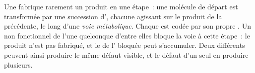 \begin{proposition}\label{prop:g11:enzymes-and-phenotype:pathway}
Une  fabrique rarement un produit en une étape~: une molécule de
départ est transformée par une succession d', chacune agissant
sur le produit de la précédente, le long d'une
\emph{voie métabolique}. Chaque  est
codée par son propre . Un  non fonctionnel de l'une
quelconque d'entre elles bloque la voie à cette étape~: le produit
n'est pas fabriqué, et le  de l' bloquée peut
s'accumuler. Deux  différents peuvent ainsi produire le même défaut
visible, et le défaut d'un seul  en produire plusieurs.
\end{proposition}
\admitted

